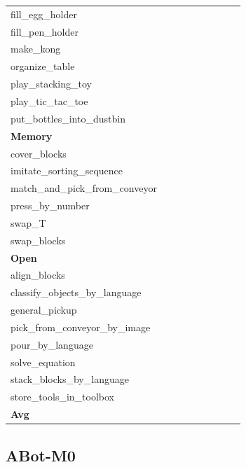 \begin{table}[H]
{\begin{tabular}{l|c|c|c|c|c|c|c|c}
fill\_egg\_holder &  &  &  &  &  &  &  &  \\
fill\_pen\_holder &  &  &  &  &  &  &  &  \\
make\_kong &  &  &  &  &  &  &  &  \\
organize\_table &  &  &  &  &  &  &  &  \\
play\_stacking\_toy &  &  &  &  &  &  &  &  \\
play\_tic\_tac\_toe &  &  &  &  &  &  &  &  \\
put\_bottles\_into\_dustbin &  &  &  &  &  &  &  &  \\
\hline
\multicolumn{9}{l}{\textbf{Memory}} \\
cover\_blocks &  &  &  &  &  &  &  &  \\
imitate\_sorting\_sequence &  &  &  &  &  &  &  &  \\
match\_and\_pick\_from\_conveyor &  &  &  &  &  &  &  &  \\
press\_by\_number &  &  &  &  &  &  &  &  \\
swap\_T &  &  &  &  &  &  &  &  \\
swap\_blocks &  &  &  &  &  &  &  &  \\
\hline
\multicolumn{9}{l}{\textbf{Open}} \\
align\_blocks &  &  &  &  &  &  &  &  \\
classify\_objects\_by\_language &  &  &  &  &  &  &  &  \\
general\_pickup &  &  &  &  &  &  &  &  \\
pick\_from\_conveyor\_by\_image &  &  &  &  &  &  &  &  \\
pour\_by\_language &  &  &  &  &  &  &  &  \\
solve\_equation &  &  &  &  &  &  &  &  \\
stack\_blocks\_by\_language &  &  &  &  &  &  &  &  \\
store\_tools\_in\_toolbox &  &  &  &  &  &  &  &  \\
\hline
\textbf{Avg} &  &  &  &  &  &  &  &  \\
\hline
\end{tabular}
}
\end{table}
\subsection{ABot-M0}
\label{part:abot_m0}

